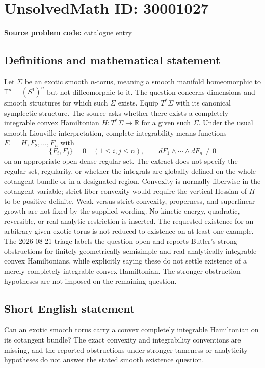 \documentclass[11pt]{article}
\newcommand{\R}{\mathbb{R}}
\begin{document}
\section*{UnsolvedMath ID: 30001027}
\textbf{Source problem code:} catalogue entry
\subsection{Definitions and mathematical statement}
Let $\Sigma$ be an exotic smooth $n$-torus, meaning a smooth manifold homeomorphic to $\mathbb T^n=(S^1)^n$ but not diffeomorphic to it. The question concerns dimensions and smooth structures for which such $\Sigma$ exists. Equip $T^*\Sigma$ with its canonical symplectic structure. The source asks whether there exists a completely integrable convex Hamiltonian $H:T^*\Sigma\to\R$ for a given such $\Sigma$. Under the usual smooth Liouville interpretation, complete integrability means functions $F_1=H,F_2,\ldots,F_n$ with \[\{F_i,F_j\}=0\quad(1\leq i,j\leq n),\qquad dF_1\wedge\cdots\wedge dF_n\ne0\] on an appropriate open dense regular set. The extract does not specify the regular set, regularity, or whether the integrals are globally defined on the whole cotangent bundle or in a designated region. Convexity is normally fiberwise in the cotangent variable; strict fiber convexity would require the vertical Hessian of $H$ to be positive definite. Weak versus strict convexity, properness, and superlinear growth are not fixed by the supplied wording. No kinetic-energy, quadratic, reversible, or real-analytic restriction is inserted. The requested existence for an arbitrary given exotic torus is not reduced to existence on at least one example. The 2026-08-21 triage labels the question open and reports Butler's strong obstructions for finitely geometrically semisimple and real analytically integrable convex Hamiltonians, while explicitly saying these do not settle existence of a merely completely integrable convex Hamiltonian. The stronger obstruction hypotheses are not imposed on the remaining question.
\subsection{Short English statement}
Can an exotic smooth torus carry a convex completely integrable Hamiltonian on its cotangent bundle? The exact convexity and integrability conventions are missing, and the reported obstructions under stronger tameness or analyticity hypotheses do not answer the stated smooth existence question.
\end{document}

